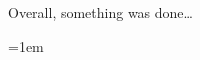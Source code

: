 \documentclass[12pt]{report}
\begin{document}
Overall, something was done\dots


\emergencystretch=1em

\printbibliography
{}




\end{document}
